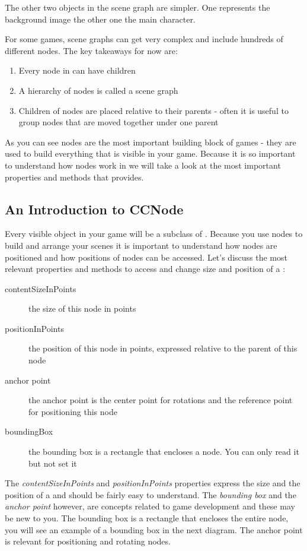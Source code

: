 The other two objects in the scene graph are simpler. One represents the
background image the other one the main character.

For some games, scene graphs can get very complex and include hundreds of
different nodes. The key takeaways for now are:

\begin{enumerate}
  \item Every node in \cocos{} can have children
  \item A hierarchy of nodes is called a scene graph
  \item Children of nodes are placed relative to their parents - often it is
  useful to group nodes that are moved together under one parent
\end{enumerate}

As you can see nodes are the most important building block of \cocos{} games -
they are used to build everything that is visible in your game. Because it
is so important to understand how nodes work in \cocos{} we will take a look at
the most important properties and methods that \ccnode{} provides.

\subsection{An Introduction to CCNode}\label{Introduction_CCNode}
Every visible object in your game will be a subclass of \ccnode{}. Because
you use nodes to build and arrange your scenes it is important to understand
how nodes are positioned and how positions of nodes can be accessed. Let's
discuss the most relevant properties and methods to access and change
size and position of a \ccnode{}:

\begin{description}
\item[contentSizeInPoints] the size of this node in points
\item[positionInPoints] the position of this node in points, expressed relative
to the parent of this node
\item[anchor point] the anchor point is the center point for rotations and the reference point for positioning this node
\item[boundingBox] the bounding box is a rectangle that encloses a node. You can
only read it but not set it
\end{description}

The \textit{contentSizeInPoints} and \textit{positionInPoints} properties
express the size and the position of a \ccnode{} and should be fairly easy to
understand. The \textit{bounding box} and the \textit{anchor point} however, are
concepts related to game development and these may be new to you. The bounding
box is a rectangle that encloses the entire node, you will see an example of a
bounding box in the next diagram. The anchor point is relevant for positioning
and rotating nodes.

